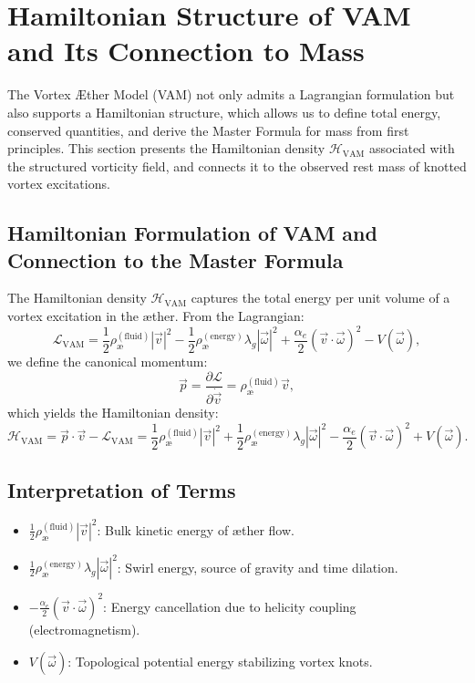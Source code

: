 \section{Hamiltonian Structure of VAM and Its Connection to Mass}

The Vortex \AE ther Model (VAM) not only admits a Lagrangian formulation but also supports a Hamiltonian structure, which allows us to define total energy, conserved quantities, and derive the Master Formula for mass from first principles. This section presents the Hamiltonian density \( \mathcal{H}_\text{VAM} \) associated with the structured vorticity field, and connects it to the observed rest mass of knotted vortex excitations.

\subsection{Hamiltonian Formulation of VAM and Connection to the Master Formula}

The Hamiltonian density \( \mathcal{H}_\text{VAM} \) captures the total energy per unit volume of a vortex excitation in the æther. From the Lagrangian:
\begin{equation}
\mathcal{L}_\text{VAM} =
\frac{1}{2} \rho_\text{\ae}^{(\text{fluid})} |\vec{v}|^2
- \frac{1}{2} \rho_\text{\ae}^{(\text{energy})} \lambda_g |\vec{\omega}|^2
+ \frac{\alpha_e}{2} (\vec{v} \cdot \vec{\omega})^2
- V(\vec{\omega}),
\end{equation}
we define the canonical momentum:
\begin{equation}
\vec{p} = \frac{\partial \mathcal{L}}{\partial \dot{\vec{v}}} = \rho_\text{\ae}^{(\text{fluid})} \vec{v},
\end{equation}
which yields the Hamiltonian density:
\begin{equation}
\mathcal{H}_\text{VAM} = \vec{p} \cdot \vec{v} - \mathcal{L}_\text{VAM}
= \frac{1}{2} \rho_\text{\ae}^{(\text{fluid})} |\vec{v}|^2
+ \frac{1}{2} \rho_\text{\ae}^{(\text{energy})} \lambda_g |\vec{\omega}|^2
- \frac{\alpha_e}{2} (\vec{v} \cdot \vec{\omega})^2
+ V(\vec{\omega}).
\end{equation}

\subsection*{Interpretation of Terms}
\begin{itemize}
    \item \( \frac{1}{2} \rho_\text{\ae}^{(\text{fluid})} |\vec{v}|^2 \): Bulk kinetic energy of æther flow.
    \item \( \frac{1}{2} \rho_\text{\ae}^{(\text{energy})} \lambda_g |\vec{\omega}|^2 \): Swirl energy, source of gravity and time dilation.
    \item \( -\frac{\alpha_e}{2} (\vec{v} \cdot \vec{\omega})^2 \): Energy cancellation due to helicity coupling (electromagnetism).
    \item \( V(\vec{\omega}) \): Topological potential energy stabilizing vortex knots.
\end{itemize}

